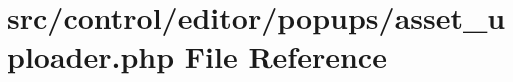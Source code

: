 \hypertarget{asset__uploader_8php}{}\section{src/control/editor/popups/asset\+\_\+uploader.php File Reference}
\label{asset__uploader_8php}

